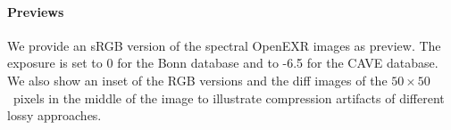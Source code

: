 \paragraph{Previews}

We provide an sRGB version of the spectral OpenEXR images as preview.
The exposure is set to 0 for the Bonn database and to -6.5 for the CAVE database.
We also show an inset of the RGB versions and the diff images of the $50\times50$~pixels in the middle of the image to illustrate compression artifacts of different lossy approaches.

\clearpage
